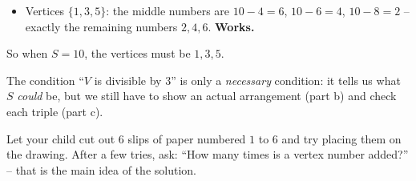 {\begin{itemize}[leftmargin=1.4em,itemsep=0pt,topsep=1pt]
  \item Vertices $\{1, 3, 5\}$: the middle numbers are $10 - 4 = 6$, $10 - 6 = 4$, $10 - 8 = 2$ -- exactly the remaining numbers
  $2, 4, 6$. \textbf{Works.}
\end{itemize}
So when $S = 10$, the vertices must be $1, 3, 5$.
\begin{warnbox}The condition ``$V$ is divisible by $3$'' is only a \emph{necessary} condition: it tells us what $S$ \emph{could} be, but
we still have to show an actual arrangement (part b) and check each triple (part c).\end{warnbox}
\begin{parentbox}Let your child cut out $6$ slips of paper numbered $1$ to $6$ and try placing them on the drawing. After a few tries,
ask: ``How many times is a vertex number added?'' -- that is the main idea of the solution.\end{parentbox}
}
